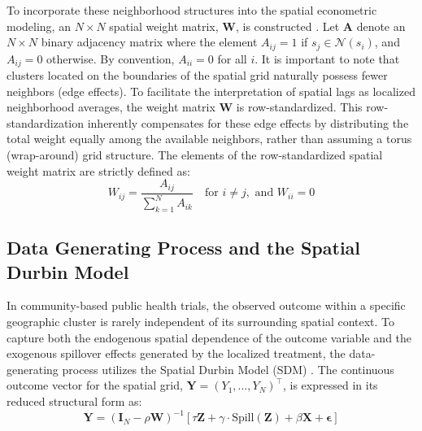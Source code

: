 \documentclass[11pt]{article}
\begin{document}
To incorporate these neighborhood structures into the spatial econometric modeling, an $N \times N$ spatial weight matrix, $\bm{W}$, is constructed \cite{lesage_introduction_2009}. Let $\bm{A}$ denote an $N \times N$ binary adjacency matrix where the element $A_{ij} = 1$ if $s_j \in \mathcal{N}(s_i)$, and $A_{ij} = 0$ otherwise. By convention, $A_{ii} = 0$ for all $i$. It is important to note that clusters located on the boundaries of the spatial grid naturally possess fewer neighbors (edge effects). To facilitate the interpretation of spatial lags as localized neighborhood averages, the weight matrix $\bm{W}$ is row-standardized. This row-standardization inherently compensates for these edge effects by distributing the total weight equally among the available neighbors, rather than assuming a torus (wrap-around) grid structure. The elements of the row-standardized spatial weight matrix are strictly defined as:
\begin{equation}
    W_{ij} = \frac{A_{ij}}{\sum_{k=1}^N A_{ik}} \quad \text{for } i \neq j, \text{ and } W_{ii} = 0
\end{equation}

\subsection{Data Generating Process and the Spatial Durbin Model}

In community-based public health trials, the observed outcome within a specific geographic cluster is rarely independent of its surrounding spatial context. To capture both the endogenous spatial dependence of the outcome variable and the exogenous spillover effects generated by the localized treatment, the data-generating process utilizes the Spatial Durbin Model (SDM) \cite{lesage_introduction_2009}. The continuous outcome vector for the spatial grid, $\bm{Y} = (Y_1, \dots, Y_N)^\top$, is expressed in its reduced structural form as:
\begin{equation}
    \bm{Y} = (\bm{I}_N - \rho \bm{W})^{-1} [\tau \bm{Z} + \gamma \cdot \text{Spill}(\bm{Z}) + \beta \bm{X} + \bm{\epsilon}]
\end{equation}
\end{document}
